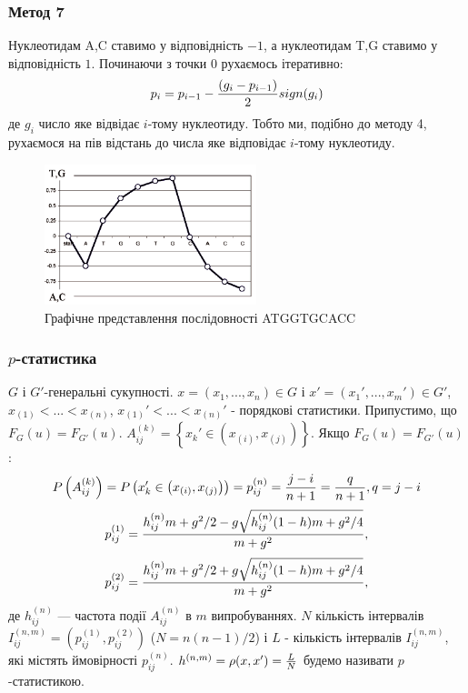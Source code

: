 \documentclass[mathserif,serif,10pt]{beamer}
\begin{document}
\begin{frame}
\frametitle{Метод 7}
Нуклеотидам A,C ставимо у відповідність $-1$, а нуклеотидам T,G ставимо у відповідність $1$. Починаючи з точки $0$ рухаємось ітеративно:
\[p_i = p_{i-1} - {(g_i-p_{i-1}) \over{2}}sign(g_i)\]
де $g_i$ число яке відвідає $i$-тому нуклеотиду. Тобто ми, подібно до методу 4, рухаємося на пів відстань до числа яке відповідає $i$-тому нуклеотиду.

\begin{figure}[h!]
\centering
\includegraphics[width=0.55\textwidth]{meth7}
\caption{Графічне представлення послідовності ATGGTGCACC}
\end{figure}

\end{frame}

\begin{frame}
\frametitle{$p$-статистика}
$G$ і $G'$-генеральні сукупності.
$x=(x_1,...,x_n)\in G$ і $x'=(x_1',...,x_m')\in G'$, $x_{(1)}<...<x_{(n)}$, $x_{(1)}'<...<x_{(n)}'$ - порядкові статистики.
Припустимо, що $F_G(u) = F_{G'}(u)$.
$A_{ij}^{(k)} = \left\{x_k' \in \left(x_{(i)}, x_{(j)}\right)\right\}$.
Якщо $F_G(u) = F_{G'}(u)$:
\[P\left(A_{ij}^{(k)}\right) = P\left(x_k' \in \left(x_{(i)}, x_{(j)}\right)\right) = p_{ij}^{(n)} = {{j-i}\over{n+1}} = {{q}\over{n+1}}, q = j-i\]
\begin{equation}\label{eq:p1}
p_{ij}^{(1)} = {{h_{ij}^{(n)}m+g^2/2-g\sqrt{h_{ij}^{(n)}(1-h)m+g^2/4}}\over{m+g^2}},
\end{equation}
\begin{equation}\label{eq:p2}
p_{ij}^{(2)} = {{h_{ij}^{(n)}m+g^2/2+g\sqrt{h_{ij}^{(n)}(1-h)m+g^2/4}}\over{m+g^2}},
\end{equation}
де $h_{ij}^{(n)}$ — частота події $A_{ij}^{(n)}$
в $m$ випробуваннях.
$N$ кількість інтервалів
$I_{ij}^{(n,m)} = \left(p_{ij}^{(1)},p_{ij}^{(2)}\right)$ ($N=n(n-1)/2$) і $L$ -
кількість інтервалів $I_{ij}^{(n,m)}$, які містять ймовірності $p_{ij}^{(n)}$.
$h^{(n,m)}= \rho(x,x') = {L\over{N}}$ будемо називати $p$-статистикою.
\end{frame}
\end{document}
